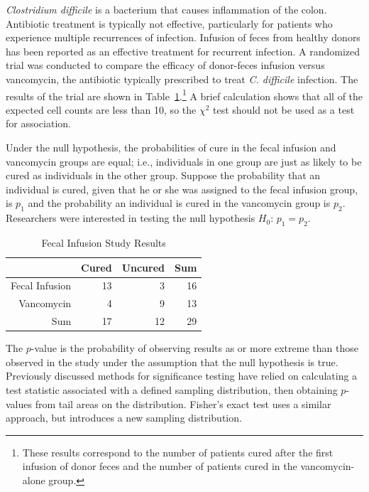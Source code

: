 \textit{Clostridium difficile} is a bacterium that causes inflammation of the colon. Antibiotic treatment is typically not effective, particularly for patients who experience multiple recurrences of infection. Infusion of feces from healthy donors has been reported as an effective treatment for recurrent infection. A randomized trial was conducted to compare the efficacy of donor-feces infusion versus vancomycin, the antibiotic typically prescribed to treat \textit{C. difficile }infection. The results of the trial are shown in Table~\ref{fecalStudyResultsTest}.\footnote{These results correspond to the number of patients cured after the first infusion of donor feces and the number of patients cured in the vancomycin-alone group.} A brief calculation shows that all of the expected cell counts are less than 10, so the $\chi^2$ test should not be used as a test for association. 

Under the null hypothesis, the probabilities of cure in the fecal infusion and vancomycin groups are equal; i.e., individuals in one group are just as likely to be cured as individuals in the other group. Suppose the probability that an individual is cured, given that he or she was assigned to the fecal infusion group, is $p_1$ and the probability an individual is cured in the vancomycin group is $p_2$. Researchers were interested in testing the null hypothesis $H_0$: $p_1 = p_2$.


\begin{table}[h]
	\centering
	\begin{tabular}{rrrr}
		\hline
		& Cured & Uncured & Sum \\ 
		\hline
		Fecal Infusion & 13 & 3 & 16 \\ 
		Vancomycin & 4 & 9 & 13 \\ 
		Sum & 17 & 12 & 29 \\ 
		\hline
	\end{tabular}
	\caption{Fecal Infusion Study Results} 
	\label{fecalStudyResultsTest}
\end{table}

The $p$-value is the probability of observing results as or more extreme than those observed in the study under  the assumption that the null hypothesis is true. Previously discussed methods for significance testing have relied on calculating a test statistic associated with a defined sampling distribution, then obtaining $p$-values from tail areas on the distribution.  Fisher's exact test uses a similar approach, but introduces a new sampling distribution.  

